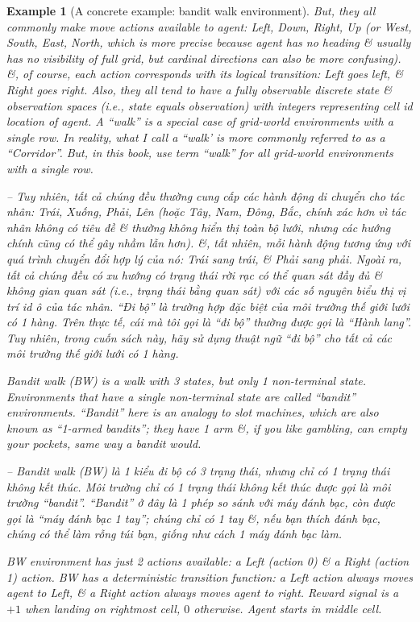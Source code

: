 \documentclass{article}
\newtheorem{example}{Example}
\begin{document}
\begin{itemize}
\begin{itemize}
\begin{itemize}
\begin{example}[A concrete example: bandit walk environment]
                But, they all commonly make move actions available to agent: Left, Down, Right, Up (or West, South, East, North, which is more precise because agent has no heading \& usually has no visibility of full grid, but cardinal directions can also be more confusing). \&, of course, each action corresponds with its logical transition: Left goes left, \& Right goes right. Also, they all tend to have a fully observable discrete state \& observation spaces (i.e., state equals observation) with integers representing cell id location of agent. A ``walk'' is a special case of grid-world environments with a single row. In reality, what I call a ``walk' is more commonly referred to as a ``Corridor''. But, in this book, use term ``walk'' for all grid-world environments with a single row.

                -- Tuy nhiên, tất cả chúng đều thường cung cấp các hành động di chuyển cho tác nhân: Trái, Xuống, Phải, Lên (hoặc Tây, Nam, Đông, Bắc, chính xác hơn vì tác nhân không có tiêu đề \& thường không hiển thị toàn bộ lưới, nhưng các hướng chính cũng có thể gây nhầm lẫn hơn). \&, tất nhiên, mỗi hành động tương ứng với quá trình chuyển đổi hợp lý của nó: Trái sang trái, \& Phải sang phải. Ngoài ra, tất cả chúng đều có xu hướng có trạng thái rời rạc có thể quan sát đầy đủ \& không gian quan sát (i.e., trạng thái bằng quan sát) với các số nguyên biểu thị vị trí id ô của tác nhân. ``Đi bộ'' là trường hợp đặc biệt của môi trường thế giới lưới có 1 hàng. Trên thực tế, cái mà tôi gọi là ``đi bộ'' thường được gọi là ``Hành lang''. Tuy nhiên, trong cuốn sách này, hãy sử dụng thuật ngữ ``đi bộ'' cho tất cả các môi trường thế giới lưới có 1 hàng.

                Bandit walk (BW) is a walk with 3 states, but only 1 non-terminal state. Environments that have a single non-terminal state are called ``bandit'' environments. ``Bandit'' here is an analogy to slot machines, which are also known as ``1-armed bandits''; they have 1 arm \&, if you like gambling, can empty your pockets, same way a bandit would.

                -- Bandit walk (BW) là 1 kiểu đi bộ có 3 trạng thái, nhưng chỉ có 1 trạng thái không kết thúc. Môi trường chỉ có 1 trạng thái không kết thúc được gọi là môi trường ``bandit''. ``Bandit'' ở đây là 1 phép so sánh với máy đánh bạc, còn được gọi là ``máy đánh bạc 1 tay''; chúng chỉ có 1 tay \&, nếu bạn thích đánh bạc, chúng có thể làm rỗng túi bạn, giống như cách 1 máy đánh bạc làm.

                BW environment has just 2 actions available: a Left (action 0) \& a Right (action 1) action. BW has a deterministic transition function: a Left action always moves agent to Left, \& a Right action always moves agent to right. Reward signal is a $+1$ when landing on rightmost cell, $0$ otherwise. Agent starts in middle cell.


\end{example}
\end{itemize}
\end{itemize}
\end{itemize}
\end{document}
